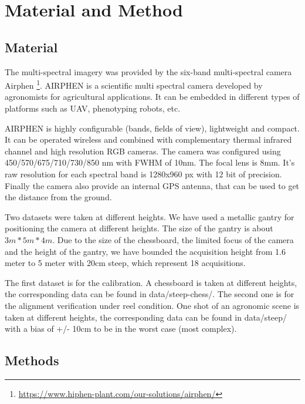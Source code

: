 \documentclass[]{elsarticle}
\begin{document}
	\section{Material and Method}
	
	\subsection{Material}
	
	The multi-spectral imagery was provided by the six-band multi-spectral camera Airphen \footnote{\url{https://www.hiphen-plant.com/our-solutions/airphen/}}.
	AIRPHEN is a scientific multi spectral camera developed by agronomists for agricultural applications.
	It can be embedded in different types of platforms such as UAV, phenotyping robots, etc.
	\\
	\par AIRPHEN is highly configurable (bands, fields of view), lightweight and compact.
	It can be operated wireless and combined with complementary thermal infrared channel and high resolution RGB cameras.
	The camera was configured using 450/570/675/710/730/850 nm with FWHM of 10nm.
	The focal lens is 8mm. It's raw resolution for each spectral band is 1280x960 px with 12 bit of precision.
	Finally the camera also provide an internal GPS antenna, that can be used to get the distance from the ground.
	\\
	\par Two datasets were taken at different heights.
	We have used a metallic gantry for positioning the camera at different heights.
	The size of the gantry is about $3m * 5m * 4m$.
	Due to the size of the chessboard, the limited focus of the camera and the height of the gantry,
	we have bounded the acquisition height from 1.6 meter to 5 meter with 20cm steep, which represent 18 acquisitions.
	\\
	\par The first dataset is for the calibration. A chessboard is taken at different heights, the corresponding data can be found in data/steep-chess/.
	The second one is for the alignment verification under reel condition.
	One shot of an agronomic scene is taken at different heights, the corresponding data can be found in data/steep/
	with a bias of +/- 10cm to be in the worst case (most complex).
	
	\newpage
	\subsection{Methods}
	
\end{document}
